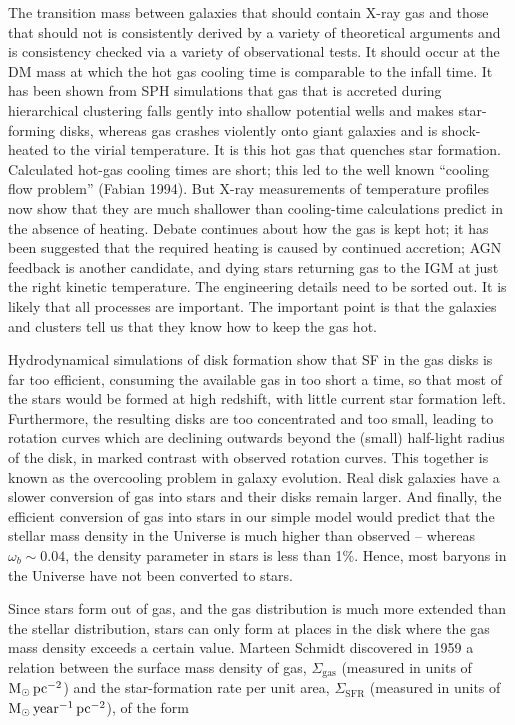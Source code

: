 \documentclass[a4paper,10pt]{article}
\begin{document}
{\noindent}The transition mass between galaxies that should contain X-ray gas and those that should not is consistently derived by a variety of theoretical arguments and is consistency checked via a variety of observational tests. It should occur at the DM mass at which the hot gas cooling time is comparable to the infall time. It has been shown from SPH simulations that gas that is accreted during hierarchical clustering falls gently into shallow potential wells and makes star-forming disks, whereas gas crashes violently onto giant galaxies and is shock-heated to the virial temperature. It is this hot gas that quenches star formation. Calculated hot-gas cooling times are short; this led to the well known ``cooling flow problem'' (Fabian 1994). But X-ray measurements of temperature profiles now show that they are much shallower than cooling-time calculations predict in the absence of heating. Debate continues about how the gas is kept hot; it has been suggested that the required heating is caused by continued accretion; AGN feedback is another candidate, and dying stars returning gas to the IGM at just the right kinetic temperature. The engineering details need to be sorted out. It is likely that all processes are important. The important point is that the galaxies and clusters tell us that they know how to keep the gas hot.

{\noindent}Hydrodynamical simulations of disk formation show that SF in the gas disks is far too efficient, consuming the available gas in too short a time, so that most of the stars would be formed at high redshift, with little current star formation left. Furthermore, the resulting disks are too concentrated and too small, leading to rotation curves which are declining outwards beyond the (small) half-light radius of the disk, in marked contrast with observed rotation curves. This together is known as the overcooling problem in galaxy evolution. Real disk galaxies have a slower conversion of gas into stars and their disks remain larger. And finally, the efficient conversion of gas into stars in our simple model would predict that the stellar mass density in the Universe is much higher than observed -- whereas $\omega_b\sim0.04$, the density parameter in stars is less than 1\%. Hence, most baryons in the Universe have not been converted to stars.

{\noindent}Since stars form out of gas, and the gas distribution is much more extended than the stellar distribution, stars can only form at places in the disk where the gas mass density exceeds a certain value. Marteen Schmidt discovered in 1959 a relation between the surface mass density of gas, $\Sigma_\mathrm{gas}$ (measured in units of ${\rm M_\odot\,pc^{-2}}$) and the star-formation rate per unit area, $\Sigma_\mathrm{SFR}$ (measured in units of ${\rm M_\odot\,year^{-1}\,pc^{-2}}$), of the form
\end{document}
